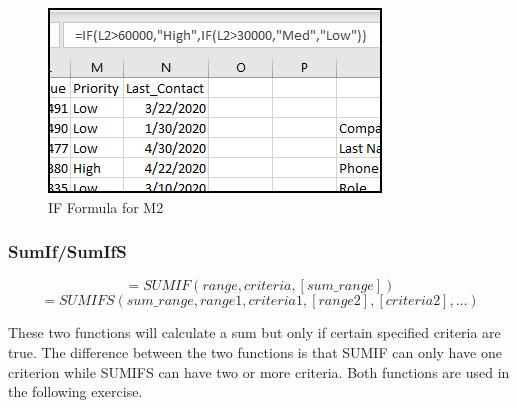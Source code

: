 \begin{enumbox}
\begin{enumerate}
		\begin{figure}[H]
			\centering
			\includegraphics[width=\maxwidth{.75\linewidth}]{gfx/ch09_fig41}
			\caption{IF Formula for M2}
			\label{09:fig41}
		\end{figure}
		
	\end{enumerate}
\end{enumbox}
	
\subsubsection{SumIf/SumIfS}

\[ =SUMIF(range, criteria, [sum\_range]) \]
\[ =SUMIFS(sum\_range, range1, criteria1, [range2], [criteria2], ...) \]

These two functions will calculate a sum but only if certain specified criteria are true. The difference between the two functions is that SUMIF can only have one criterion while SUMIFS can have two or more criteria. Both functions are used in the following exercise.

